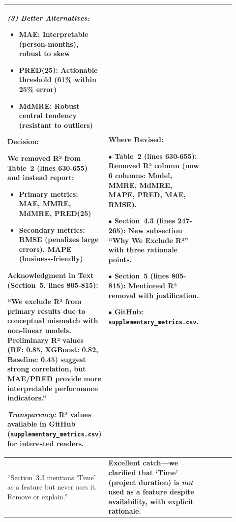\documentclass[11pt,a4paper]{article}
\begin{document}
\begin{longtable}{>{\raggedright\arraybackslash}p{0.26\linewidth}|>{\raggedright\arraybackslash}p{0.44\linewidth}|>{\raggedright\arraybackslash}p{0.22\linewidth}}
\textit{(3) Better Alternatives:}

\begin{itemize}
    \item \textbf{MAE}: Interpretable (person-months), robust to skew
    \item \textbf{PRED(25)}: Actionable threshold (61\% within 25\% error)
    \item \textbf{MdMRE}: Robust central tendency (resistant to outliers)
\end{itemize}

\textbf{Decision:}

We \textbf{removed R² from Table~2} (lines 630-655) and instead report:
\begin{itemize}
    \item Primary metrics: MAE, MMRE, MdMRE, PRED(25)
    \item Secondary metrics: RMSE (penalizes large errors), MAPE (business-friendly)
\end{itemize}

\textbf{Acknowledgment in Text (Section~5, lines 805-815):}

``We exclude R² from primary results due to conceptual mismatch with non-linear models. Preliminary R² values (RF: 0.85, XGBoost: 0.82, Baseline: 0.45) suggest strong correlation, but MAE/PRED provide more interpretable performance indicators.''

\textit{Transparency:} R² values available in GitHub (\texttt{supplementary\_metrics.csv}) for interested readers. &

\textbf{Where Revised:}

$\bullet$ \textbf{Table~2} (lines 630-655): Removed R² column (now 6 columns: Model, MMRE, MdMRE, MAPE, PRED, MAE, RMSE).

$\bullet$ \textbf{Section~4.3} (lines 247-265): New subsection ``Why We Exclude R²'' with three rationale points.

$\bullet$ \textbf{Section~5} (lines 805-815): Mentioned R² removal with justification.

$\bullet$ \textbf{GitHub}: \texttt{supplementary\_metrics.csv}. \\

\midrule

``Section~3.3 mentions 'Time' as a feature but never uses it. Remove or explain.'' &

\textbf{Excellent catch---we clarified that `Time' (project duration) is \textit{not} used as a feature despite availability, with explicit rationale.}


\end{longtable}
\end{document}
